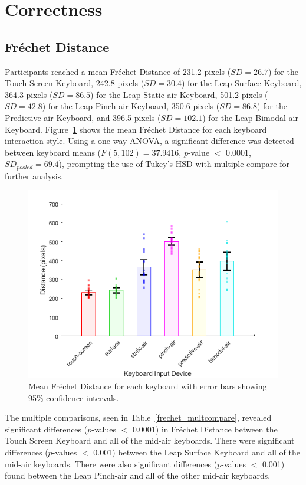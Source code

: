 \section{Correctness}
\subsection{Fr\'echet Distance} \label{results_frechet}
Participants reached a mean Fr\'echet Distance of 231.2 pixels ($SD = 26.7$) for the Touch Screen Keyboard, 242.8 pixels ($SD = 30.4$) for the Leap Surface Keyboard, 364.3 pixels ($SD = 86.5$) for the Leap Static-air Keyboard, 501.2 pixels ($SD = 42.8$) for the Leap Pinch-air Keyboard, 350.6 pixels ($SD = 86.8$) for the Predictive-air Keyboard, and 396.5 pixels ($SD = 102.1$) for the Leap Bimodal-air Keyboard. Figure~\ref{fig_frechet_mean} shows the mean Fr\'echet Distance for each keyboard interaction style. Using a one-way ANOVA, a significant difference was detected between keyboard means ($F(5, 102) = 37.9416$, $p$-value $<$ 0.0001, $SD_{pooled} = 69.4$), prompting the use of Tukey's HSD with multiple-compare for further analysis.

\begin{figure}[!t]
	\centering
	\includegraphics{Figures/fig_frechet_mean}
	\caption[Mean Fr\'echet Distance]{Mean Fr\'echet Distance for each keyboard with error bars showing 95\% confidence intervals.}
	\label{fig_frechet_mean}
\end{figure}

The multiple comparisons, seen in Table~\ref{frechet_multcompare}, revealed significant differences ($p$-values $<$ 0.0001) in Fr\'echet Distance between the Touch Screen Keyboard and all of the mid-air keyboards. There were significant differences ($p$-values $<$ 0.001) between the Leap Surface Keyboard and all of the mid-air keyboards. There were also significant differences ($p$-values $<$ 0.001) found between the Leap Pinch-air and all of the other mid-air keyboards.

